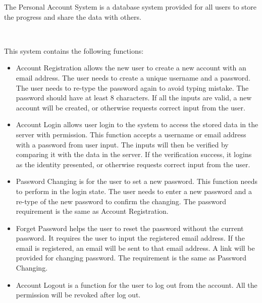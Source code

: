 The Personal Account System is a database system provided for all users to store the progress and share the data with others.

~

This system contains the following functions:
\begin{itemize}
	\item Account Registration allows the new user to create a new account with an email address. The user needs to create a unique username and a password. The user needs to re-type the password again to avoid typing mistake. The password should have at least 8 characters. If all the inputs are valid, a new account will be created, or otherwise requests correct input from the user.
	\item Account Login allows user login to the system to access the stored data in the server with permission. This function accepts a username or email address with a password from user input. The inputs will then be verified by comparing it with the data in the server. If the verification success, it logins as the identity presented, or otherwise requests correct input from the user.
	\item Password Changing is for the user to set a new password. This function needs to perform in the login state. The user needs to enter a new password and a re-type of the new password to confirm the changing. The password requirement is the same as Account Registration.
	\item Forget Password helps the user to reset the password without the current password. It requires the user to input the registered email address. If the email is registered, an email will be sent to that email address. A link will be provided for changing password. The requirement is the same as Password Changing.
	\item Account Logout is a function for the user to log out from the account. All the permission will be revoked after log out.
\end{itemize}